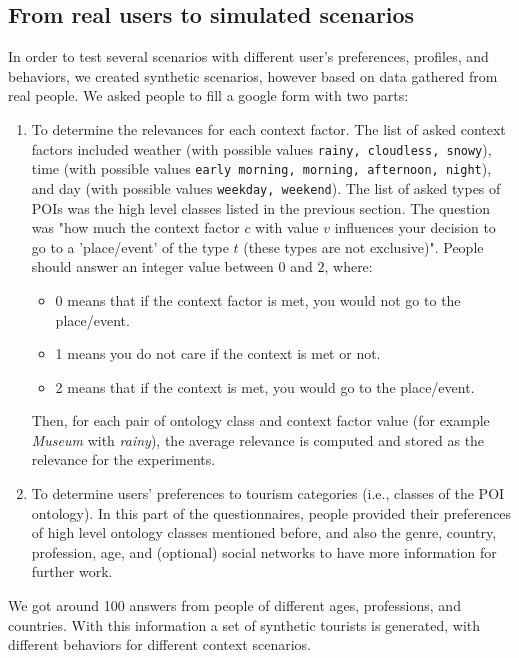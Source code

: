 \subsection{From real users to simulated scenarios}
\label{section:relevances-survey}

In order to test several scenarios with different user's preferences, profiles, and behaviors,  we created synthetic scenarios, however based on data gathered from real people.
We asked people to fill a google form with two parts: 

\begin{enumerate}
    \item To determine the relevances for each context factor. The list of asked context factors included weather (with possible values {\tt rainy, cloudless, snowy}), time (with possible values {\tt early morning, morning, afternoon, night}), and day (with possible values {\tt weekday, weekend}). The list of asked types of POIs was the high level classes listed in the previous section. The question was "how much the context factor $c$ with value $v$ influences your decision to go to a 'place/event' of the type $t$ (these types are not exclusive)". People should answer an integer value between $0$ and $2$, where: 
\begin{itemize}
    \item $0$ means that if the context factor is met, you would not go to the place/event.
    \item 1 means you do not care if the context is met or not.
    \item 2 means that if the context is met, you would go to the place/event.
\end{itemize}

Then, for each pair of ontology class and context factor value (for example \textit{Museum} with \textit{rainy}), the average relevance is computed and stored as the relevance for the experiments.


 \item To determine users' preferences to tourism categories (i.e., classes of the POI ontology). In this part of the questionnaires, people provided their preferences  of high level ontology classes mentioned before, and also the genre, country, profession, age, and (optional) social networks to have more information for further work.
 
\end{enumerate}
    
    We got around 100 answers from people of different ages, professions, and countries.  With this information a set of synthetic tourists is generated, with different behaviors for different context scenarios.
    


